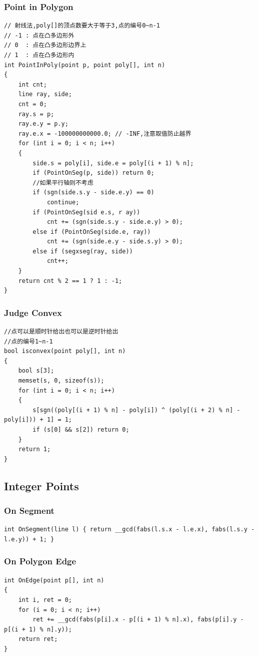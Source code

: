 \documentclass[twoside]{article}
\begin{document}
\subsubsection{Point in Polygon}
\begin{lstlisting}
// 射线法,poly[]的顶点数要大于等于3,点的编号0~n-1
// -1 : 点在凸多边形外
// 0  : 点在凸多边形边界上
// 1  : 点在凸多边形内
int PointInPoly(point p, point poly[], int n)
{
    int cnt;
    line ray, side;
    cnt = 0;
    ray.s = p;
    ray.e.y = p.y;
    ray.e.x = -100000000000.0; // -INF,注意取值防止越界
    for (int i = 0; i < n; i++)
    {
        side.s = poly[i], side.e = poly[(i + 1) % n];
        if (PointOnSeg(p, side)) return 0;
        //如果平行轴则不考虑
        if (sgn(side.s.y - side.e.y) == 0)
            continue;
        if (PointOnSeg(sid e.s, r ay))
            cnt += (sgn(side.s.y - side.e.y) > 0);
        else if (PointOnSeg(side.e, ray))
            cnt += (sgn(side.e.y - side.s.y) > 0);
        else if (segxseg(ray, side))
            cnt++;
    }
    return cnt % 2 == 1 ? 1 : -1;
}
\end{lstlisting}
\subsubsection{Judge Convex}
\begin{lstlisting}
//点可以是顺时针给出也可以是逆时针给出
//点的编号1~n-1
bool isconvex(point poly[], int n)
{
    bool s[3];
    memset(s, 0, sizeof(s));
    for (int i = 0; i < n; i++)
    {
        s[sgn((poly[(i + 1) % n] - poly[i]) ^ (poly[(i + 2) % n] - poly[i])) + 1] = 1;
        if (s[0] && s[2]) return 0;
    }
    return 1;
}
\end{lstlisting}
\subsection{Integer Points}
\subsubsection{On Segment}
\begin{lstlisting}
int OnSegment(line l) { return __gcd(fabs(l.s.x - l.e.x), fabs(l.s.y - l.e.y)) + 1; }
\end{lstlisting}
\subsubsection{On Polygon Edge}
\begin{lstlisting}
int OnEdge(point p[], int n)
{
    int i, ret = 0;
    for (i = 0; i < n; i++)
        ret += __gcd(fabs(p[i].x - p[(i + 1) % n].x), fabs(p[i].y - p[(i + 1) % n].y));
    return ret;
}
\end{lstlisting}
\end{document}
